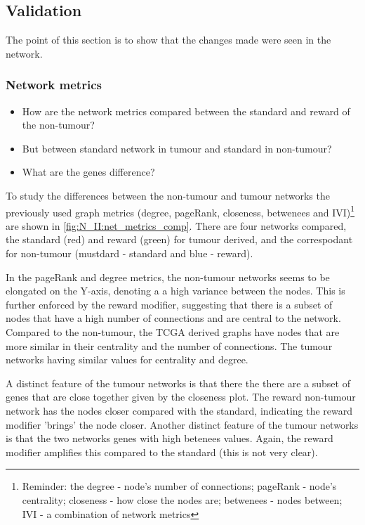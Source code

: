 \subsection{Validation} \label{s:N_II:validation}

The point of this section is to show that the changes made were seen in the network.


\subsubsection{Network metrics}

\begin{itemize}
    \item How are the network metrics compared between the standard and reward of the non-tumour?
    \item But between standard network in tumour and standard in non-tumour?
    \item What are the genes difference?
\end{itemize}

To study the differences between the non-tumour and tumour networks the previously used graph metrics (degree, pageRank, closeness, betwenees and IVI)\footnote{Reminder: the degree - node's number of connections; pageRank - node's centrality; closeness - how close the nodes are; betwenees - nodes between; IVI - a combination of network metrics} are shown in \cref{fig:N_II:net_metrics_comp}. There are four networks compared, the standard (red) and reward (green) for tumour derived, and the correspodant for non-tumour (mustdard - standard and blue - reward).

In the pageRank and degree metrics, the non-tumour networks seems to be elongated on the Y-axis, denoting a a high variance between the nodes. This is further enforced by the reward modifier, suggesting that there is a subset of nodes that have a high number of connections and are central to the network. Compared to the non-tumour, the TCGA derived graphs have nodes that are more similar in their centrality and the number of connections. The tumour networks having similar values for centrality and degree. 

A distinct feature of the tumour networks is that there the there are a subset of genes that are close together given by the closeness plot. The reward non-tumour network has the nodes closer compared with the standard, indicating the reward modifier 'brings' the node closer. Another distinct feature of the tumour networks is that the two networks genes with high betenees values. Again, the reward modifier amplifies this compared to the standard (this is not very clear).

